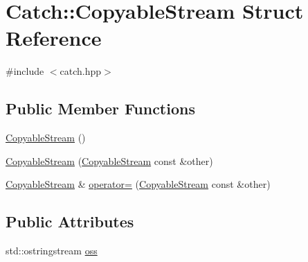 \hypertarget{structCatch_1_1CopyableStream}{\section{Catch\-:\-:Copyable\-Stream Struct Reference}
\label{structCatch_1_1CopyableStream}
}


{\ttfamily \#include $<$catch.\-hpp$>$}

\subsection*{Public Member Functions}
\begin{DoxyCompactItemize}
\item 
\hyperlink{structCatch_1_1CopyableStream_a5a61d0da675ae00cd46efaef4c445cdd}{Copyable\-Stream} ()
\item 
\hyperlink{structCatch_1_1CopyableStream_a0e72dc16240653f52c17106f4bf34da8}{Copyable\-Stream} (\hyperlink{structCatch_1_1CopyableStream}{Copyable\-Stream} const \&other)
\item 
\hyperlink{structCatch_1_1CopyableStream}{Copyable\-Stream} \& \hyperlink{structCatch_1_1CopyableStream_a1760fa29b38011c5845171260bec0966}{operator=} (\hyperlink{structCatch_1_1CopyableStream}{Copyable\-Stream} const \&other)
\end{DoxyCompactItemize}
\subsection*{Public Attributes}
\begin{DoxyCompactItemize}
\item 
std\-::ostringstream \hyperlink{structCatch_1_1CopyableStream_ae123fb4d673e7d7a13a3c5f6bc5d426c}{oss}
\end{DoxyCompactItemize}


